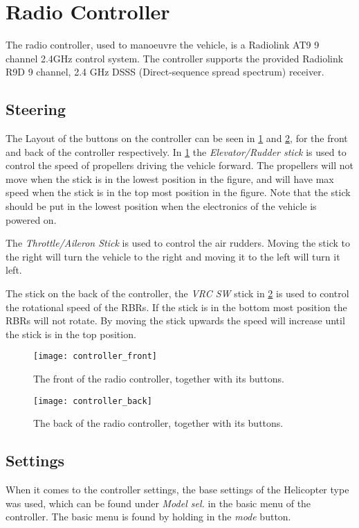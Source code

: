 \section{Radio Controller}
The radio controller, used to manoeuvre the vehicle, is a Radiolink AT9 9 channel
2.4GHz control system. The controller supports the provided Radiolink R9D
9 channel, 2.4 GHz DSSS (Direct-sequence spread spectrum) receiver.

\subsection{Steering}
The Layout of the buttons on the controller can be seen in
\cref{fig:controller_front} and \cref{fig:controller_back}, for the front and
back of the controller respectively. In \cref{fig:controller_front} the
\textit{Elevator/Rudder stick} is used to control the speed of propellers
driving the vehicle forward. The propellers will not move when the stick is in the
lowest position in the figure, and will have max speed when the stick is in the
top most position in the figure. Note that the stick should be put in the
lowest position when the electronics of the vehicle is powered on.

The \textit{Throttle/Aileron Stick} is used to control the air rudders. Moving
the stick to the right will turn the vehicle to the right and moving it to the
left will turn it left.

The stick on the back of the controller, the \textit{VRC SW} stick in
\cref{fig:controller_back} is used to control the rotational speed of the RBRs.
If the stick is in the bottom most position the RBRs will not rotate. By moving
the stick upwards the speed will increase until the stick is in the top
position.

\begin{figure}[h]
   \centering
   \texttt{[image: controller\_front]}
   \caption{The front of the radio controller, together with its buttons.}
   \label{fig:controller_front}
\end{figure}

\begin{figure}[h]
   \centering
   \texttt{[image: controller\_back]}
   \caption{The back of the radio controller, together with its buttons.}
   \label{fig:controller_back}
\end{figure}

\subsection{Settings}
When it comes to the controller settings, the base settings of the Helicopter type was used, which can be found under \textit{Model sel.} in the basic
menu of the controller. The basic menu is found by holding in the \textit{mode}
button.

